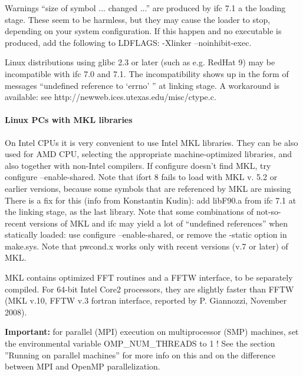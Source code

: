 \documentclass[12pt,a4paper]{article}
\begin{document}
Warnings “size of symbol ... changed ...” are produced by ifc 7.1 a
the loading stage. These seem to be harmless, but they may cause the
loader to stop, depending on your system configuration. If this happen
and no executable is produced, add the following to LDFLAGS: -Xlinker
--noinhibit-exec. 

Linux distributions using glibc 2.3 or later (such as e.g. RedHat 9) may be
incompatible with ifc 7.0 and 7.1. The incompatibility shows up in the form
of messages “undefined reference to ‘errno' ” at linking stage. A workaround
is available: see http://newweb.ices.utexas.edu/misc/ctype.c.

\paragraph{Linux PCs with MKL libraries}
On Intel CPUs it is very convenient to use Intel MKL libraries. They can be
also used for AMD CPU, selecting the appropriate machine-optimized
libraries, and also together with non-Intel compilers.
If configure doesn't find MKL, try configure --enable-shared. 
Note that ifort 8 fails to load with MKL v. 5.2 or earlier
versions, because some symbols that are referenced by MKL are missing
There is a ﬁx for this (info from Konstantin Kudin): add libF90.a from ifc
7.1 at the linking stage, as the last library. Note that some combinations of
not-so-recent versions of MKL and ifc may yield a lot of “undefined
references” when statically loaded: use configure --enable-shared, or
remove the -static option in make.sys. Note that pwcond.x works only
with recent versions (v.7 or later) of MKL.

MKL contains optimized FFT routines and a FFTW interface, to be separately
compiled. For 64-bit Intel Core2 processors, they are slightly faster than 
FFTW (MKL v.10, FFTW v.3 fortran interface, reported by P. Giannozzi,
November 2008). 

{\bf Important:} for parallel (MPI) execution on multiprocessor (SMP)
machines, set the environmental variable OMP\_NUM\_THREADS to 1 ! See
the section  ''Running on parallel machines'' for more info on this
and on the difference between MPI and OpenMP parallelization. 
\end{document}
